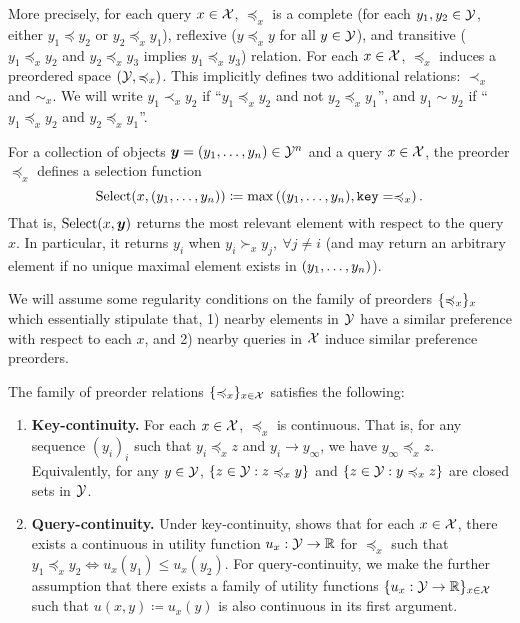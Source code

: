 More precisely, for each query $x \in {\mathcal{X}}$, $\preceq_x$ is a complete (for each $y_1, y_2 \in {\mathcal{Y}}$, either $y_1 \preceq y_2$ or $y_2 \preceq_x y_1$), reflexive ($y \preceq_x y$ for all $y \in {\mathcal{Y}}$), and transitive ($y_1 \preceq_x y_2$ and $y_2 \preceq_x y_3$ implies $y_1 \preceq_x y_3$) relation. For each $x \in {\mathcal{X}}$, $\preceq_x$ induces a preordered space $({\mathcal{Y}}, \preccurlyeq_x)$. This implicitly defines two additional relations: $\prec_x$ and $\sim_x$. We will write $y_1 \prec_x y_2$ if ``$y_1 \preceq_x y_2$ and not $y_2 \preceq_x y_1$'', and $y_1 \sim y_2$ if ``$y_1 \preceq_x y_2$ and $y_2 \preceq_x y_1$''.

For a collection of objects $\bm{y} = (y_1, \ldots, y_n) \in {\mathcal{Y}}^n$ and a query $x \in {\mathcal{X}}$, the preorder $\preceq_x$ defines a selection function
\begin{equation}\label{eq:def_selection}
  \mathrm{Select}(x, (y_1, \ldots, y_n)) \coloneq \max\left((y_1, \ldots, y_n), \mathtt{key}=\preccurlyeq_x\right).
\end{equation}
That is, $\mathrm{Select}(x, \bm{y})$ returns the most relevant element with respect to the query $x$. In particular, it returns $y_i$ when $y_i \succ_x y_j, \ \forall j \neq i$ (and may return an arbitrary element if no unique maximal element exists in $(y_1, \ldots, y_n)$).

We will assume some regularity conditions on the family of preorders $\{\preccurlyeq_x\}_x$ which essentially stipulate that, 1) nearby elements in ${\mathcal{Y}}$ have a similar preference with respect to each $x$, and 2) nearby queries in ${\mathcal{X}}$ induce similar preference preorders.

\begin{assumption}\label{ass:qk_cts}
  The family of preorder relations $\{\preccurlyeq_x\}_{x \in {\mathcal{X}}}$ satisfies the following:
  \begin{enumerate}
    \item \textbf{Key-continuity.} For each $x \in {\mathcal{X}}$, $\preceq_x$ is continuous. That is, for any sequence $(y_i)_i$ such that $y_i \preceq_x z$ and $y_i \to y_{\infty}$, we have $y_\infty \preceq_x z$. Equivalently, for any $y \in {\mathcal{Y}}$, $\{z \in {\mathcal{Y}} : z \preccurlyeq_x y\}$ and $\{z \in {\mathcal{Y}} : y \preccurlyeq_x z\}$ are closed sets in ${\mathcal{Y}}$.
    \item \textbf{Query-continuity.} Under key-continuity, \citet{debreu1954representation} shows that for each $x \in {\mathcal{X}}$, there exists a continuous in utility function $u_x: {\mathcal{Y}} \to \mathbb{R}$ for $\preceq_x$ such that $y_1 \preceq_x y_2 \iff u_x(y_1) \leq u_x(y_2)$. For query-continuity, we make the further assumption that there exists a family of utility functions $\{u_x: {\mathcal{Y}} \to \mathbb{R}\}_{x \in {\mathcal{X}}}$ such that  $u(x, y) \coloneq u_x(y)$ is also continuous in its first argument.
  \end{enumerate}
\end{assumption}

